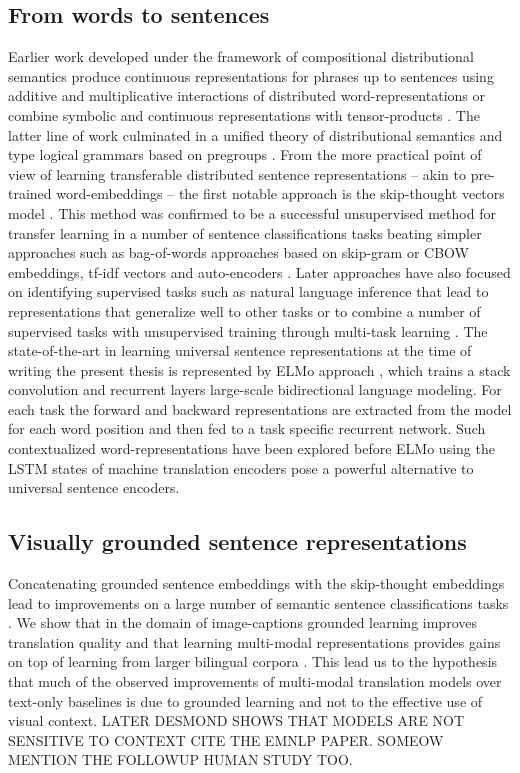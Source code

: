 \subsection{From words to sentences}
Earlier work developed under the framework of compositional distributional semantics produce continuous representations for phrases up to sentences using additive and multiplicative interactions of distributed word-representations \cite{mitchell2008vector} or combine symbolic and continuous representations with tensor-products \cite{clark2007combining}. The latter line of work culminated in a unified theory of distributional semantics and type logical grammars based on pregroups \cite{coecke2010mathematical}.
From the more practical point of view of learning transferable distributed sentence representations -- akin to pre-trained word-embeddings -- the first notable approach is the skip-thought vectors model \cite{kiros2015skip}.
This method was confirmed to be a successful unsupervised method for transfer learning in a number of sentence classifications tasks beating simpler approaches such as bag-of-words approaches based on skip-gram or CBOW embeddings, tf-idf vectors and auto-encoders \cite{hill2016learning}.
Later approaches have also focused on identifying supervised tasks such as natural language inference \cite{conneau-EtAl:2017:EMNLP2017} that lead to representations that generalize well to other tasks or to combine a number of supervised tasks with unsupervised training through multi-task learning \cite{subramanian2018learning}. The state-of-the-art in learning universal sentence representations at the time of writing the present thesis is represented by ELMo approach \cite{peters2018deep}, which trains a stack convolution and recurrent layers large-scale bidirectional language modeling. For each task the forward and backward representations are extracted from the model for each word position and then fed to a task specific recurrent network. Such contextualized word-representations have been explored before ELMo using the LSTM states of machine translation encoders \cite{mccann2017learned} pose a powerful alternative to universal sentence encoders.

\subsection{Visually grounded sentence representations}
Concatenating grounded sentence embeddings with the skip-thought embeddings lead to improvements on a large number of semantic sentence classifications tasks \cite{kiela2017learning}. We show that in the domain of image-captions
grounded learning improves translation quality and that learning multi-modal representations provides gains on top of learning from larger bilingual corpora \cite{elliott2017imagination}.
This lead us to the hypothesis that much of the observed improvements of multi-modal translation models over text-only baselines is due to grounded learning and not to the effective use of visual context. LATER DESMOND SHOWS THAT MODELS ARE NOT SENSITIVE TO CONTEXT CITE THE EMNLP PAPER. SOMEOW MENTION THE FOLLOWUP HUMAN STUDY TOO.



